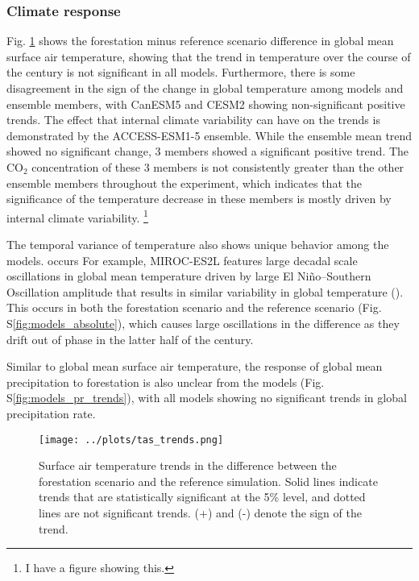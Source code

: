 \documentclass[]{article}
\begin{document}
\subsubsection{Climate response}

Fig. \ref{fig:models_tas_trends} shows the forestation minus reference scenario difference in global mean surface air temperature, showing that the trend in temperature over the course of the century is not significant in all models.
Furthermore, there is some disagreement in the sign of the change in global temperature among models and ensemble members, with CanESM5 and CESM2 showing non-significant positive trends.
The effect that internal climate variability can have on the trends is demonstrated by the ACCESS-ESM1-5 ensemble.
While the ensemble mean trend showed no significant change, 3 members showed a significant positive trend.
The CO$_2$ concentration of these 3 members is not consistently greater than the other ensemble members throughout the experiment, which indicates that the significance of the temperature decrease in these members is mostly driven by internal climate variability. \footnote{I have a figure showing this.}

The temporal variance of temperature also shows unique behavior among the models.
 occurs For example, MIROC-ES2L features large decadal scale oscillations in global mean temperature driven by large El Niño–Southern Oscillation amplitude that results in similar variability in global temperature (\cite{hajima_development_2020}). This occurs in both the forestation scenario and the reference scenario (Fig. S\ref{fig:models_absolute}), which causes large oscillations in the difference as they drift out of phase in the latter half of the century.

Similar to global mean surface air temperature, the response of global mean precipitation to forestation is also unclear from the models (Fig. S\ref{fig:models_pr_trends}), with all models showing no significant trends in global precipitation rate.

\begin{figure}[H]
    \centering
    \texttt{[image: ../plots/tas\_trends.png]}
    \caption{Surface air temperature trends in the difference between the forestation scenario and the reference simulation. Solid lines indicate trends that are statistically significant at the 5\% level, and dotted lines are not significant trends. (+) and (-) denote the sign of the trend.}
    \label{fig:models_tas_trends}
\end{figure}
\end{document}

